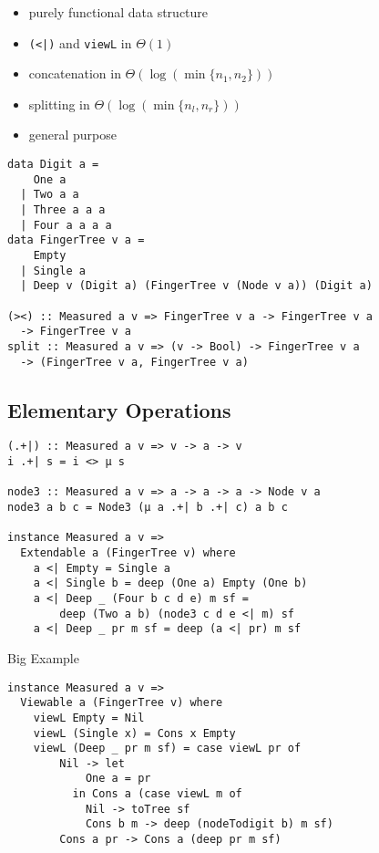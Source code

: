 \begin{frame}
  \begin{itemize}[<+->]
    \item purely functional data structure
    \item \texttt{(<|)} and \texttt{viewL} in \(\Theta(1)\)
    \item concatenation in \(\Theta(\log(\min\{n_1,n_2\}))\)
    \item splitting in \(\Theta(\log(\min\{n_l,n_r\}))\)
    \item general purpose
  \end{itemize}
\end{frame}


\begin{frame}[fragile]
\begin{verbatim}
data Digit a =
    One a 
  | Two a a 
  | Three a a a 
  | Four a a a a
data FingerTree v a =
    Empty
  | Single a
  | Deep v (Digit a) (FingerTree v (Node v a)) (Digit a)

(><) :: Measured a v => FingerTree v a -> FingerTree v a
  -> FingerTree v a
split :: Measured a v => (v -> Bool) -> FingerTree v a 
  -> (FingerTree v a, FingerTree v a)
  \end{verbatim}
\end{frame}

\subsection{Elementary Operations}
\begin{frame}[fragile]
  \begin{verbatim}
(.+|) :: Measured a v => v -> a -> v
i .+| s = i <> μ s

node3 :: Measured a v => a -> a -> a -> Node v a
node3 a b c = Node3 (μ a .+| b .+| c) a b c

instance Measured a v =>
  Extendable a (FingerTree v) where
    a <| Empty = Single a
    a <| Single b = deep (One a) Empty (One b)
    a <| Deep _ (Four b c d e) m sf =
        deep (Two a b) (node3 c d e <| m) sf
    a <| Deep _ pr m sf = deep (a <| pr) m sf
  \end{verbatim}
\end{frame}

\begin{frame}
  Big Example
\end{frame}

\begin{frame}[fragile]
  \begin{verbatim}
instance Measured a v => 
  Viewable a (FingerTree v) where
    viewL Empty = Nil
    viewL (Single x) = Cons x Empty
    viewL (Deep _ pr m sf) = case viewL pr of
        Nil -> let 
            One a = pr 
          in Cons a (case viewL m of
            Nil -> toTree sf
            Cons b m -> deep (nodeTodigit b) m sf)
        Cons a pr -> Cons a (deep pr m sf)
  \end{verbatim}
\end{frame}

